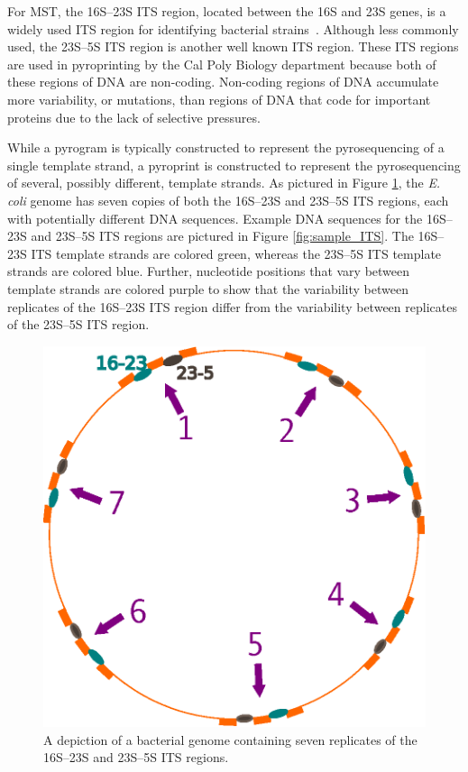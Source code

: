 \documentclass[12pt]{ucthesis}
\begin{document}
      For MST, the 16S--23S ITS region, located between the 16S and 23S genes,
      is a widely used ITS region for identifying bacterial
      strains~\cite{Boyer:ITS, Roth:Phylo, Tyler:Primers}. Although less
      commonly used, the 23S--5S ITS region is another well known ITS region.
      These ITS regions are used in pyroprinting by the Cal Poly Biology
      department because both of these regions of DNA are non-coding.
      Non-coding regions of DNA accumulate more variability, or mutations, than
      regions of DNA that code for important proteins due to the lack of
      selective pressures.
      
      While a pyrogram is typically constructed to represent the pyrosequencing
      of a single template strand, a pyroprint is constructed to represent the
      pyrosequencing of several, possibly different, template strands. As
      pictured in Figure \ref{fig:genome}, the \textit{E. coli} genome has
      seven copies of both the 16S--23S and 23S--5S ITS regions, each with
      potentially different DNA sequences. Example DNA sequences for the
      16S--23S and 23S--5S ITS regions are pictured in Figure
      \ref{fig:sample_ITS}. The 16S--23S ITS template strands are colored
      green, whereas the 23S--5S ITS template strands are colored blue.
      Further, nucleotide positions that vary between template strands are
      colored purple to show that the variability between replicates of the
      16S--23S ITS region differ from the variability between replicates of the
      23S--5S ITS region.
      
      \begin{figure}[t]
         \centering
         \includegraphics[width=0.45\columnwidth]{graphics/genome_with_highlighted_regions.eps}
         \caption{A depiction of a bacterial genome containing seven replicates
                  of the 16S--23S and 23S--5S ITS regions.}
         \label{fig:genome}
      \end{figure}
\end{document}
